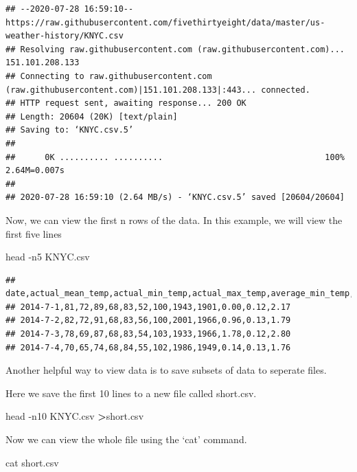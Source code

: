 \documentclass[]{book}
\newenvironment{Shaded}{\begin{snugshade}}{\end{snugshade}}
\newcommand{\FunctionTok}[1]{\textcolor[rgb]{0.00,0.00,0.00}{#1}}
\newcommand{\OperatorTok}[1]{\textcolor[rgb]{0.81,0.36,0.00}{\textbf{#1}}}
\newcommand{\NormalTok}[1]{#1}
\begin{document}
\begin{verbatim}
## --2020-07-28 16:59:10--  https://raw.githubusercontent.com/fivethirtyeight/data/master/us-weather-history/KNYC.csv
## Resolving raw.githubusercontent.com (raw.githubusercontent.com)... 151.101.208.133
## Connecting to raw.githubusercontent.com (raw.githubusercontent.com)|151.101.208.133|:443... connected.
## HTTP request sent, awaiting response... 200 OK
## Length: 20604 (20K) [text/plain]
## Saving to: ‘KNYC.csv.5’
## 
##      0K .......... ..........                                 100% 2.64M=0.007s
## 
## 2020-07-28 16:59:10 (2.64 MB/s) - ‘KNYC.csv.5’ saved [20604/20604]
\end{verbatim}

Now, we can view the first n rows of the data. In this example, we will
view the first five lines

\begin{Shaded}
\begin{Highlighting}[]
\FunctionTok{head}\NormalTok{ -n5 KNYC.csv}
\end{Highlighting}
\end{Shaded}

\begin{verbatim}
## date,actual_mean_temp,actual_min_temp,actual_max_temp,average_min_temp,average_max_temp,record_min_temp,record_max_temp,record_min_temp_year,record_max_temp_year,actual_precipitation,average_precipitation,record_precipitation
## 2014-7-1,81,72,89,68,83,52,100,1943,1901,0.00,0.12,2.17
## 2014-7-2,82,72,91,68,83,56,100,2001,1966,0.96,0.13,1.79
## 2014-7-3,78,69,87,68,83,54,103,1933,1966,1.78,0.12,2.80
## 2014-7-4,70,65,74,68,84,55,102,1986,1949,0.14,0.13,1.76
\end{verbatim}

Another helpful way to view data is to save subsets of data to seperate
files.

Here we save the first 10 lines to a new file called short.csv.

\begin{Shaded}
\begin{Highlighting}[]
\FunctionTok{head}\NormalTok{ -n10 KNYC.csv }\OperatorTok{>}\NormalTok{short.csv}
\end{Highlighting}
\end{Shaded}

Now we can view the whole file using the `cat' command.

\begin{Shaded}
\begin{Highlighting}[]
\FunctionTok{cat}\NormalTok{ short.csv}
\end{Highlighting}
\end{Shaded}
\end{document}
